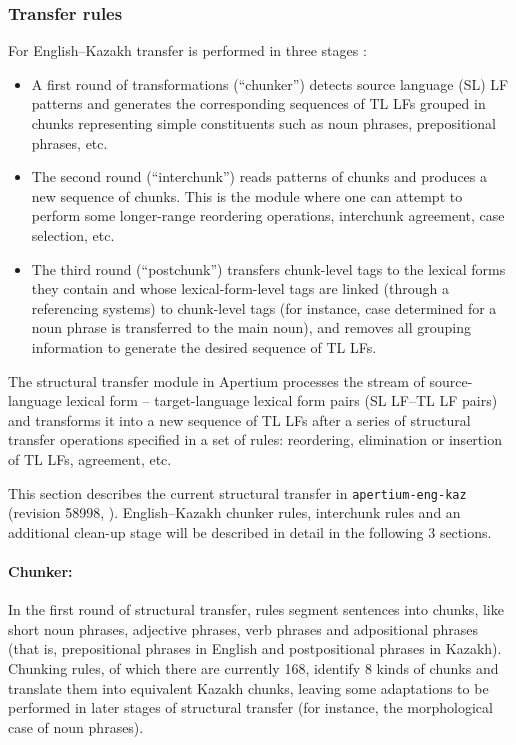 \documentclass[11pt]{article}
\begin{document}
\subsubsection{Transfer rules}

For English--Kazakh transfer is performed in three stages \citep{sundetova13b}:

\begin{itemize}
\item A first round of transformations (``chunker'') detects source language (SL) LF patterns and generates the 
  corresponding sequences of TL LFs grouped in chunks representing simple constituents such as noun phrases, prepositional phrases, etc. 
\item The second round (``interchunk'') reads patterns of chunks and produces a new sequence of chunks. This is the 
  module where one can attempt to perform some longer-range reordering operations, interchunk agreement, case selection, etc. 
\item The third round (``postchunk'') transfers chunk-level tags to the lexical forms they contain and whose lexical-form-level 
  tags are linked (through a referencing systems) to chunk-level tags (for instance, case determined for a noun phrase is 
  transferred to the main noun), and removes all grouping information to generate the desired sequence of TL LFs.
\end{itemize}

The structural transfer module in Apertium processes the stream of source-language lexical form -- target-language lexical 
form pairs (SL LF–TL LF pairs) and transforms it into a new sequence of TL LFs after a series of structural transfer 
operations specified in a set of rules: reordering, elimination or insertion of TL LFs, agreement, etc. 

This section describes the current structural transfer in \texttt{apertium-eng-kaz} (revision 58998, ). English--Kazakh 
chunker rules, interchunk rules and an additional clean-up stage will be described in detail in the following 3 sections. 

\paragraph{Chunker:}
In the first round of structural transfer, rules segment sentences into chunks, like short noun 
phrases, adjective phrases, verb phrases and adpositional phrases (that is, prepositional phrases in English and 
postpositional phrases in Kazakh).
Chunking rules, of which there are currently 168, identify 8 kinds of chunks and translate them into equivalent Kazakh chunks, leaving some adaptations to be performed in later stages of structural transfer (for instance, the 
morphological case of noun phrases). 
\end{document}
